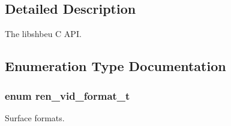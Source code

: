 \subsection{Detailed Description}
The libshbeu C API. 

\subsection{Enumeration Type Documentation}
\subsubsection[{ren\_\-vid\_\-format\_\-t}]{\setlength{\rightskip}{0pt plus 5cm}enum {\bf ren\_\-vid\_\-format\_\-t}}\label{shbeu_8h_a7c6f3f06390ea9d0f845a37c02ca4954}


Surface formats. 

